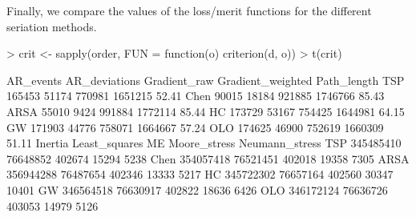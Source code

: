 \documentclass[fleqn, a4paper]{article}
\begin{document}
Finally, we compare the values of the loss/merit functions 
for the different seriation methods. 
\begin{Schunk}
\begin{Sinput}
> crit <- sapply(order, FUN = function(o) criterion(d, o))
> t(crit)
\end{Sinput}
\begin{Soutput}
     AR_events AR_deviations Gradient_raw Gradient_weighted Path_length
TSP     165453         51174       770981           1651215       52.41
Chen     90015         18184       921885           1746766       85.43
ARSA     55010          9424       991884           1772114       85.44
HC      173729         53167       754425           1644981       64.15
GW      171903         44776       758071           1664667       57.24
OLO     174625         46900       752619           1660309       51.11
       Inertia Least_squares     ME Moore_stress Neumann_stress
TSP  345485410      76648852 402674        15294           5238
Chen 354057418      76521451 402018        19358           7305
ARSA 356944288      76487654 402346        13333           5217
HC   345722302      76657164 402560        30347          10401
GW   346564518      76630917 402822        18636           6426
OLO  346172124      76636726 403053        14979           5126
\end{Soutput}
\end{Schunk}
\end{document}
